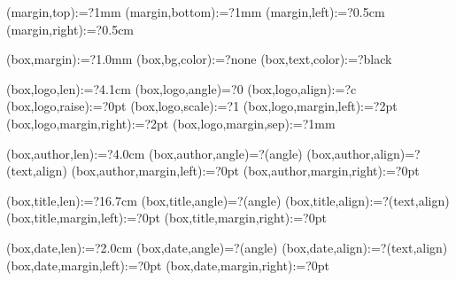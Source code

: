 \spine(margin,top):=?{1mm}
\spine(margin,bottom):=?{1mm}
\spine(margin,left):=?{0.5cm}
\spine(margin,right):=?{0.5cm}

\spine(box,margin):=?{1.0mm}
\spine(box,bg,color):=?{none}
\spine(box,text,color):=?{black}

\spine(box,logo,len):=?{4.1cm}
\spine(box,logo,angle)=?{0}
\spine(box,logo,align):=?{c}
\spine(box,logo,raise):=?{0pt}
\spine(box,logo,scale):=?{1}
\spine(box,logo,margin,left):=?{2pt}
\spine(box,logo,margin,right):=?{2pt}
\spine(box,logo,margin,sep):=?{1mm}

\spine(box,author,len):=?{4.0cm}
\spine(box,author,angle)=?{\thespine(angle)}
\spine(box,author,align)=?{\thespine(text,align)}
\spine(box,author,margin,left):=?{0pt}
\spine(box,author,margin,right):=?{0pt}

\spine(box,title,len):=?{16.7cm}
\spine(box,title,angle)=?{\thespine(angle)}
\spine(box,title,align):=?{\thespine(text,align)}
\spine(box,title,margin,left):=?{0pt}
\spine(box,title,margin,right):=?{0pt}

\spine(box,date,len):=?{2.0cm}
\spine(box,date,angle)=?{\thespine(angle)}
\spine(box,date,align):=?{\thespine(text,align)}
\spine(box,date,margin,left):=?{0pt}
\spine(box,date,margin,right):=?{0pt}



\newif\ifisdim
\newcommand{\@setifisdim}[1]{%
  \StrLeft{#1}{1}[\@dimleft]%
  \StrRight{#1}{1}[\@dimright]%
  \IfInteger{\@dimleft}{%
    \IfInteger{\@dimright}{%
      \isdimfalse%
    }{%
      \isdimtrue%
    }%
  }{%
    \isdimfalse%
  }%
}
\newcommand{\IfIsDim}[3]{%
  \@setifisdim{#1}%
  \ifisdim#2\else#3\fi%
}

%

\newdimen\@spinelen  %
\newcommand{\@checkspinelen}[1][\paperheight]{%
  \@tempdima=\thespine(margin,left)\relax%
  \@tempdimb=\thespine(margin,right)\relax%
  \DEBUG{SPINELEN MARGIN [left] = \the\@tempdima}%
  \DEBUG{SPINELEN MARGIN [right] = \the\@tempdimb}%
  \@tempdima=\dimexpr\@tempdima+\@tempdimb\relax%
  \DEBUG{SPINELEN ACCUMULATED = \the\@tempdima}%
  \StrCount{\thespine(order)}{,}[\@nBoxSep]%
  \@for\myi:=\expanded{\thespine(order)}\do{%
    \DEBUG{SPINELEN BOXLEN [\myi]}%
    \@tempdimb=\thespine(box,\myi,len)\relax%
    \DEBUG{SPINELEN BOXLEN [\myi] = \the\@tempdimb}%
    \@tempdima=\dimexpr\@tempdima+\@tempdimb\relax%
    \DEBUG{SPINELEN ACCUMULATED = \the\@tempdima}%
  }
  \DEBUG{SPINELEN MAX = \the#1}%
  \@spinelen=\@tempdima%
}


